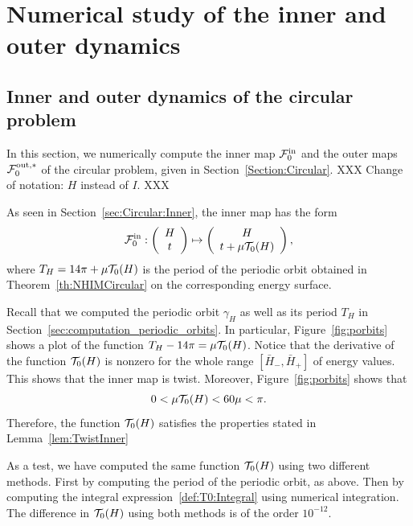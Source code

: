 \section{Numerical study of the inner and outer dynamics}
\label{sec:NumericalStudyInnerOuter}

\subsection{Inner and outer dynamics of the circular problem}
\label{app:InnerOuterCircular}

In this section, we numerically compute the inner map $\mathcal{F}_0^{\mathrm{in}}$ and
the outer maps $\mathcal{F}_0^{\mathrm{out},\ast}$ of the circular problem, given in
Section~\ref{Section:Circular}.
XXX Change of notation: $H$ instead of $I$. XXX

As seen in Section~\ref{sec:Circular:Inner}, the inner map has the
form
\begin{equation}\label{def:InnerMap:Circular:Numerics}
  \mathcal{F}_0^{\mathrm{in}}:\left(\begin{array}{c} H\\
      t
    \end{array}\right)\mapsto \left(\begin{array}{c} H\\
      t+\mu\mathcal{T}_0(H)
    \end{array}\right),
\end{equation}
where $T_H = 14\pi + \mu\mathcal{T}_0(H)$ is the period of the periodic orbit
obtained in Theorem~\ref{th:NHIMCircular} on the corresponding energy
surface.

Recall that we computed the periodic orbit $\gamma_H$ as well as its
period $T_H$ in Section~\ref{sec:computation_periodic_orbits}.
In particular, Figure~\ref{fig:porbits} shows a plot of the function
$T_H - 14\pi = \mu\mathcal{T}_0(H)$. 
Notice that the derivative of the function $\mathcal{T}_0(H)$ is nonzero for
the whole range $[\bar H_-, \bar H_+]$ of energy values. 
This shows that the inner map is twist. 
Moreover, Figure~\ref{fig:porbits} shows that 
\[ 0<\mu\mathcal{T}_0(H)<60\mu<\pi. \]
Therefore, the function $\mathcal{T}_0(H)$ satisfies the properties
stated in Lemma~\ref{lem:TwistInner}

As a test, we have computed the same function $\mathcal{T}_0(H)$ using two
different methods. First by computing the period of the periodic
orbit, as above. Then by computing the integral
expression~\eqref{def:T0:Integral} using numerical integration. The
difference in $\mathcal{T}_0(H)$ using both methods is of the order
$10^{-12}$.

